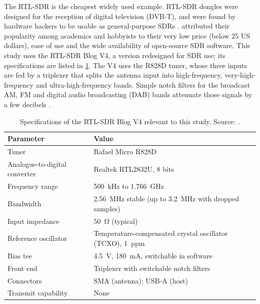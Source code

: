 The RTL-SDR is the cheapest widely used example. RTL-SDR dongles were designed for the reception of digital television (DVB-T), and were found by hardware hackers to be usable as general-purpose SDRs \parencite[p.~1]{rtlsdrblog2024}. \Textcite{calvopalomino2017} attributed their popularity among academics and hobbyists to their very low price (below 25 US dollars), ease of use and the wide availability of open-source SDR software. This study uses the RTL-SDR Blog V4, a version redesigned for SDR use; its specifications are listed in \cref{tab:rtlsdr-v4}. The V4 uses the R828D tuner, whose three inputs are fed by a triplexer that splits the antenna input into high-frequency, very-high-frequency and ultra-high-frequency bands. Simple notch filters for the broadcast AM, FM and digital audio broadcasting (DAB) bands attenuate those signals by a few decibels \parencite[p.~1]{rtlsdrblog2024}.

\begin{table}[tbp]
  \centering
  \caption[Specifications of the RTL-SDR Blog V4]{Specifications of the RTL-SDR Blog V4 relevant to this study. Source: \textcite[p.~1]{rtlsdrblog2024}.}
  \label{tab:rtlsdr-v4}
  \begin{tabularx}{\textwidth}{@{} l >{\raggedright\arraybackslash}X @{}}
    \toprule
    Parameter & Value \\
    \midrule
    Tuner & Rafael Micro R828D \\
    Analogue-to-digital converter & Realtek RTL2832U, 8 bits \\
    Frequency range & \qty{500}{\kilo\hertz} to \qty{1.766}{\giga\hertz} \\
    Bandwidth & \qty{2.56}{\mega\hertz} stable (up to \qty{3.2}{\mega\hertz} with dropped samples) \\
    Input impedance & \qty{50}{\ohm} (typical) \\
    Reference oscillator & Temperature-compensated crystal oscillator (TCXO), \qty{1}{ppm} \\
    Bias tee & \qty{4.5}{\volt}, \qty{180}{\milli\ampere}, switchable in software \\
    Front end & Triplexer with switchable notch filters \\
    Connectors & SMA (antenna); USB-A (host) \\
    Transmit capability & None \\
    \bottomrule
  \end{tabularx}
\end{table}


